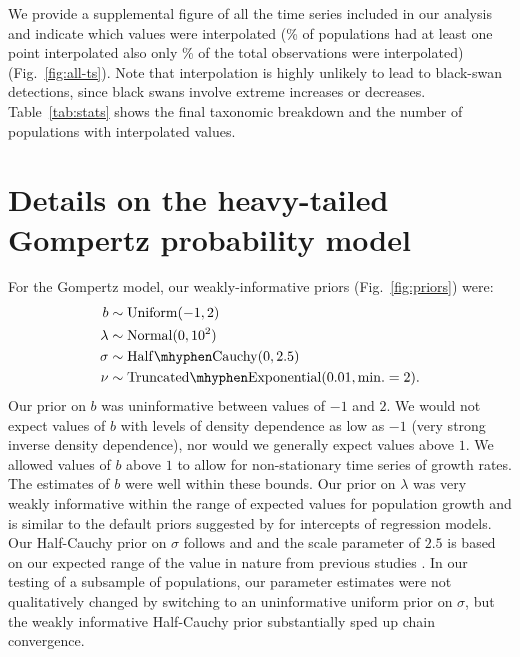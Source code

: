 \noindent
We provide a supplemental figure of all the time series included in our analysis and indicate which values were interpolated (\percImputedPops\% of populations had at least one point interpolated also only \percImputedPoints\% of the total observations were interpolated) (Fig.~\ref{fig:all-ts}). Note that interpolation is highly unlikely to lead to black-swan detections, since black swans involve extreme increases or decreases. Table~\ref{tab:stats} shows the final taxonomic breakdown and the number of populations with interpolated values.

\section{Details on the heavy-tailed Gompertz probability model}

For the Gompertz model, our weakly-informative priors (Fig.~\ref{fig:priors}) were:
\begin{align*}
b &\sim \mathrm{Uniform}(-1, 2)\\ \lambda &\sim \mathrm{Normal}(0, 10^2)\\
\sigma &\sim \mathrm{Half\mhyphen Cauchy} (0, 2.5)\\ \nu &\sim
\mathrm{Truncated\mhyphen Exponential}(0.01, \mathrm{min.} = 2).
\end{align*}
Our prior on $b$ was uninformative between values of $-1$ and $2$. We would not expect values of $b$ with levels of density dependence as low as $-1$ (very strong inverse density dependence), nor would we generally expect values above $1$. We allowed values of $b$ above $1$ to allow for non-stationary time series of growth rates. The estimates of $b$ were well within these bounds. Our prior on $\lambda$ was very weakly informative within the range of expected values for population growth and is similar to the default priors suggested by \citet{gelman2008d} for intercepts of regression models. Our Half-Cauchy prior on $\sigma$ follows \citet{gelman2006c} and \citet{gelman2008d} and the scale parameter of $2.5$ is based on our expected range of the value in nature from previous studies \citep[e.g.][]{connors2014}. In our testing of a subsample of populations, our parameter estimates were not qualitatively changed by switching to an uninformative uniform prior on $\sigma$, but the weakly informative Half-Cauchy prior substantially sped up chain convergence.


